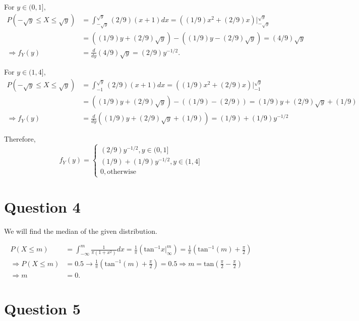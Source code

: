 \documentclass[11pt]{article} %
\begin{document}
For $y \in (0,1],$
\begin{align*}
P(-\sqrt{y}\leq X \leq \sqrt{y}) &= \int_{-\sqrt{y}}^{\sqrt{y}} (2/9) (x+1) dx = ((1/9)x^2  + (2/9)x)|_{-\sqrt{y}}^{\sqrt{y}}\\
 &= ((1/9)y + (2/9)\sqrt{y}) -((1/9)y - (2/9)\sqrt{y}) = (4/9) \sqrt{y} \\
\Rightarrow f_Y(y) &= \frac{d}{dy} (4/9)\sqrt{y} = (2/9)y^{-1/2}.
\end{align*}

For $y \in (1,4],$
\begin{align*}
P(-\sqrt{y}\leq X \leq \sqrt{y}) &= \int_{-1}^{\sqrt{y}} (2/9) (x+1) dx = ((1/9)x^2  + (2/9)x)|_{-1}^{\sqrt{y}}\\
 &= ((1/9)y + (2/9)\sqrt{y}) -((1/9) - (2/9)) = (1/9)y + (2/9)\sqrt{y} + (1/9) \\
\Rightarrow f_Y(y) &= \frac{d}{dy} \left((1/9)y + (2/9)\sqrt{y} + (1/9)\right)  = (1/9) +(1/9)y^{-1/2}
\end{align*}

Therefore,
\begin{equation*}
f_Y(y) = \begin{cases} (2/9)y^{-1/2}, y \in (0,1] \\  (1/9) +(1/9)y^{-1/2}, y \in (1,4] \\ 0, \text{otherwise} \end{cases}
\end{equation*}

\section{Question 4}
We will find the median of the given distribution.

\begin{align*}
P(X\leq m) &= \int_{-\infty}^m \frac{1}{\pi (1+x^2)} dx = \frac{1}{\pi}(\text{tan}^{-1} x |_{\infty}^{m}) = \frac{1}{\pi}\left(\text{tan}^{-1}(m) + \frac{\pi}{2}\right) \\
\Rightarrow P(X \leq m) &= 0.5 \rightarrow \frac{1}{\pi}\left( \text{tan}^{-1}(m) + \frac{\pi}{2}\right) = 0.5 \Rightarrow m = \text{tan}\left(\frac{\pi}{2} - \frac{\pi}{2}\right)\\
\Rightarrow m &= 0.
\end{align*}

\section{Question 5}
%
\end{document}
